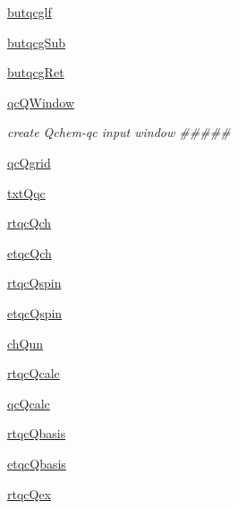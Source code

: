 \begin{DoxyCompactItemize}
\item 
\hyperlink{classmolSimplify_1_1Classes_1_1mGUI_1_1mGUI_ad91a8f8d2dc110ca40c4f81d5412735c}{butqcglf}
\item 
\hyperlink{classmolSimplify_1_1Classes_1_1mGUI_1_1mGUI_af603c7cc87c7fefb60b80330690343b4}{butqcg\+Sub}
\item 
\hyperlink{classmolSimplify_1_1Classes_1_1mGUI_1_1mGUI_a5a9dceb5e34671cf188332342151db45}{butqcg\+Ret}
\item 
\hyperlink{classmolSimplify_1_1Classes_1_1mGUI_1_1mGUI_a84db38704c6ec5724ca8b14d19fbee75}{qc\+Q\+Window}
\begin{DoxyCompactList}\small\item\em create Qchem-\/qc input window \#\#\#\#\# \end{DoxyCompactList}\item 
\hyperlink{classmolSimplify_1_1Classes_1_1mGUI_1_1mGUI_ad9ecc160374cdf5a5d27c9a64464dccc}{qc\+Qgrid}
\item 
\hyperlink{classmolSimplify_1_1Classes_1_1mGUI_1_1mGUI_ad2a190bf04c835adde9e770f6c0b4e1e}{txt\+Qqc}
\item 
\hyperlink{classmolSimplify_1_1Classes_1_1mGUI_1_1mGUI_a08858254d0081638f2f996f2e3fb81a8}{rtqc\+Qch}
\item 
\hyperlink{classmolSimplify_1_1Classes_1_1mGUI_1_1mGUI_a2b6084004611afd68e27cd4b42d13dc4}{etqc\+Qch}
\item 
\hyperlink{classmolSimplify_1_1Classes_1_1mGUI_1_1mGUI_a29e5e83289aa9a72119fd7a52fc7fcf4}{rtqc\+Qspin}
\item 
\hyperlink{classmolSimplify_1_1Classes_1_1mGUI_1_1mGUI_a495b7e5e8ca81ad63412ad4cd74c2743}{etqc\+Qspin}
\item 
\hyperlink{classmolSimplify_1_1Classes_1_1mGUI_1_1mGUI_a452f4bbe596ea0bf418f6d9b0798d380}{ch\+Qun}
\item 
\hyperlink{classmolSimplify_1_1Classes_1_1mGUI_1_1mGUI_a19f9215f3c32f5ec4e632bb157ee2dcd}{rtqc\+Qcalc}
\item 
\hyperlink{classmolSimplify_1_1Classes_1_1mGUI_1_1mGUI_ac8b76f85af2cbeaadc524ab3a3736ef1}{qc\+Qcalc}
\item 
\hyperlink{classmolSimplify_1_1Classes_1_1mGUI_1_1mGUI_a523a7a137c89dbc5b4e50c61cc004449}{rtqc\+Qbasis}
\item 
\hyperlink{classmolSimplify_1_1Classes_1_1mGUI_1_1mGUI_acee0d0736a6f75c6fa8a948dc1577c15}{etqc\+Qbasis}
\item 
\hyperlink{classmolSimplify_1_1Classes_1_1mGUI_1_1mGUI_a1be0ca04a420ffbf8b0e942171e4e0d0}{rtqc\+Qex}

\end{DoxyCompactItemize}
